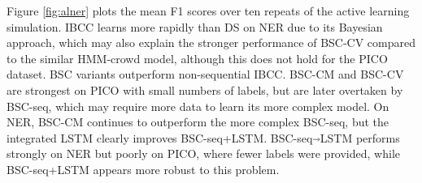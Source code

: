  Figure \ref{fig:alner} plots the mean F1 scores over ten repeats of the active learning simulation.
 IBCC learns more rapidly than DS on NER due to its Bayesian approach,
 which may also explain the stronger performance
 of BSC-CV compared to the similar HMM-crowd model, although this does not hold for the PICO dataset.
 BSC variants outperform non-sequential IBCC. BSC-CM and BSC-CV are strongest on PICO with small numbers of labels,
 but are later overtaken by BSC-seq, which may require more data to learn its more complex model.
 On NER, BSC-CM continues to outperform the more complex BSC-seq,
 but the integrated LSTM clearly improves BSC-seq+LSTM.
 BSC-seq$\Arrow{0.2cm}$LSTM performs strongly on NER but poorly on PICO, where fewer labels were provided,
 while BSC-seq+LSTM appears more robust to this problem.  

